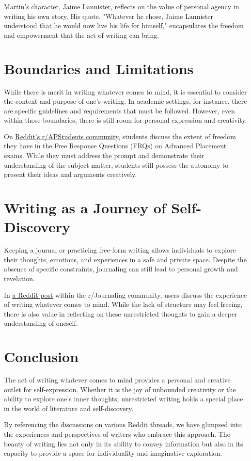 \documentclass{article}
\begin{document}
Martin's character, Jaime Lannister, reflects on the value of personal agency in writing his own story. His quote, "Whatever he chose, Jaime Lannister understood that he would now live his life for himself," encapsulates the freedom and empowerment that the act of writing can bring.

\section{Boundaries and Limitations}

While there is merit in writing whatever comes to mind, it is essential to consider the context and purpose of one's writing. In academic settings, for instance, there are specific guidelines and requirements that must be followed. However, even within those boundaries, there is still room for personal expression and creativity.

On \href{https://www.reddit.com/r/APStudents/comments/1347rvw/can\_you\_write\_whatever\_you\_want\_in\_the\_frq/}{Reddit's r/APStudents community}, students discuss the extent of freedom they have in the Free Response Questions (FRQs) on Advanced Placement exams. While they must address the prompt and demonstrate their understanding of the subject matter, students still possess the autonomy to present their ideas and arguments creatively.

\section{Writing as a Journey of Self-Discovery}

Keeping a journal or practicing free-form writing allows individuals to explore their thoughts, emotions, and experiences in a safe and private space. Despite the absence of specific constraints, journaling can still lead to personal growth and revelation.

In \href{https://www.reddit.com/r/Journaling/comments/105icv2/writing\_whatever\_comes\_to\_mind\_feels\_nice\_but\_is/}{a Reddit post} within the r/Journaling community, users discuss the experience of writing whatever comes to mind. While the lack of structure may feel freeing, there is also value in reflecting on these unrestricted thoughts to gain a deeper understanding of oneself.

\section{Conclusion}

The act of writing whatever comes to mind provides a personal and creative outlet for self-expression. Whether it is the joy of unbounded creativity or the ability to explore one's inner thoughts, unrestricted writing holds a special place in the world of literature and self-discovery.

By referencing the discussions on various Reddit threads, we have glimpsed into the experiences and perspectives of writers who embrace this approach. The beauty of writing lies not only in its ability to convey information but also in its capacity to provide a space for individuality and imaginative exploration.
\end{document}
